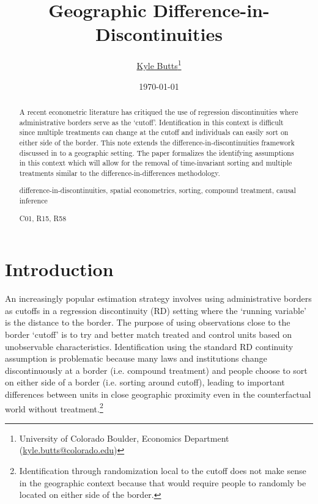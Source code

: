 \documentclass[12pt]{article}
\title{\color{navyblue} Geographic Difference-in-Discontinuities}
\author{\href{https://kylebutts.com/}{Kyle Butts}\thanks{University of Colorado Boulder, Economics Department (\href{mailto:kyle.butts@colorado.edu}{kyle.butts@colorado.edu})}}
\date{\footnotesize\today}
\begin{document}
\begin{titlepage}
    \maketitle
    
    \begin{abstract}
        {\small
        A recent econometric literature has critiqued the use of regression discontinuities where administrative borders serve as the `cutoff'. Identification in this context is difficult since multiple treatments can change at the cutoff and individuals can easily sort on either side of the border. This note extends the difference-in-discontinuities framework discussed in \citet{Grembi_Nannicini_Troiano_2016} to a geographic setting. The paper formalizes the identifying assumptions in this context which will allow for the removal of time-invariant sorting and multiple treatments similar to the difference-in-differences methodology.
    
        \par
         difference-in-discontinuities, spatial econometrics, sorting, compound treatment, causal inference
        \par
         C01, R15, R58
        \par
        }
    \end{abstract}
\end{titlepage}

\section{Introduction}

An increasingly popular estimation strategy involves using administrative borders as cutoffs in a regression discontinuity (RD) setting where the `running variable' is the distance to the border. The purpose of using observations close to the border `cutoff' is to try and better match treated and control units based on unobservable characteristics. Identification using the standard RD continuity assumption is problematic because many laws and institutions change discontinuously at a border (i.e. compound treatment)  and people choose to sort on either side of a border (i.e. sorting around cutoff), leading to important differences between units in close geographic proximity even in the counterfactual world without treatment.\footnote{Identification through randomization local to the cutoff does not make sense in the geographic context because that would require people to randomly be located on either side of the border.} 
\end{document}
